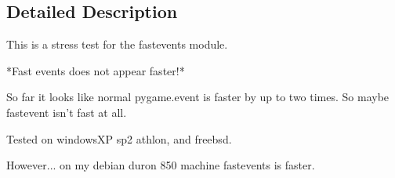 \subsection{Detailed Description}
\begin{DoxyVerb}This is a stress test for the fastevents module.

*Fast events does not appear faster!*

So far it looks like normal pygame.event is faster by up to two times.
So maybe fastevent isn't fast at all.

Tested on windowsXP sp2 athlon, and freebsd.

However... on my debian duron 850 machine fastevents is faster.
\end{DoxyVerb}
 